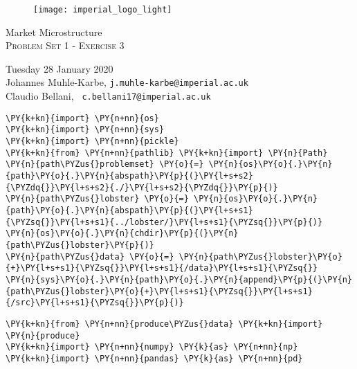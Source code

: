 \documentclass[11pt]{article}
\begin{document}
    
	
	\begin{center}
		\begin{figure}
			\texttt{[image: imperial\_logo\_light]}
		\end{figure}
	\begin{Large}
		Market Microstructure \\
		\textsc{Problem Set 1 - Exercise 3}
	\end{Large}
	\end{center}

\vspace{0.2cm}

\noindent Tuesday 28 January 2020 \\
\noindent Johannes Muhle-Karbe, \small{\texttt{j.muhle-karbe@imperial.ac.uk}} \\
\noindent Claudio Bellani, \small{\texttt{ c.bellani17@imperial.ac.uk}}

\vspace{0.5cm}
    
    

    
    \begin{tcolorbox}[breakable, size=fbox, boxrule=1pt, pad at break*=1mm,colback=cellbackground, colframe=cellborder]
\begin{Verbatim}[commandchars=\\\{\}]
\PY{k+kn}{import} \PY{n+nn}{os} 
\PY{k+kn}{import} \PY{n+nn}{sys}
\PY{k+kn}{import} \PY{n+nn}{pickle}
\PY{k+kn}{from} \PY{n+nn}{pathlib} \PY{k+kn}{import} \PY{n}{Path}
\PY{n}{path\PYZus{}problemset} \PY{o}{=} \PY{n}{os}\PY{o}{.}\PY{n}{path}\PY{o}{.}\PY{n}{abspath}\PY{p}{(}\PY{l+s+s2}{\PYZdq{}}\PY{l+s+s2}{./}\PY{l+s+s2}{\PYZdq{}}\PY{p}{)}
\PY{n}{path\PYZus{}lobster} \PY{o}{=} \PY{n}{os}\PY{o}{.}\PY{n}{path}\PY{o}{.}\PY{n}{abspath}\PY{p}{(}\PY{l+s+s1}{\PYZsq{}}\PY{l+s+s1}{../lobster/}\PY{l+s+s1}{\PYZsq{}}\PY{p}{)}
\PY{n}{os}\PY{o}{.}\PY{n}{chdir}\PY{p}{(}\PY{n}{path\PYZus{}lobster}\PY{p}{)}
\PY{n}{path\PYZus{}data} \PY{o}{=} \PY{n}{path\PYZus{}lobster}\PY{o}{+}\PY{l+s+s1}{\PYZsq{}}\PY{l+s+s1}{/data}\PY{l+s+s1}{\PYZsq{}}
\PY{n}{sys}\PY{o}{.}\PY{n}{path}\PY{o}{.}\PY{n}{append}\PY{p}{(}\PY{n}{path\PYZus{}lobster}\PY{o}{+}\PY{l+s+s1}{\PYZsq{}}\PY{l+s+s1}{/src}\PY{l+s+s1}{\PYZsq{}}\PY{p}{)}
\end{Verbatim}
\end{tcolorbox}

    \begin{tcolorbox}[breakable, size=fbox, boxrule=1pt, pad at break*=1mm,colback=cellbackground, colframe=cellborder]
\begin{Verbatim}[commandchars=\\\{\}]
\PY{k+kn}{from} \PY{n+nn}{produce\PYZus{}data} \PY{k+kn}{import} \PY{n}{produce}
\PY{k+kn}{import} \PY{n+nn}{numpy} \PY{k}{as} \PY{n+nn}{np}
\PY{k+kn}{import} \PY{n+nn}{pandas} \PY{k}{as} \PY{n+nn}{pd}
\end{Verbatim}
\end{tcolorbox}
\end{document}
